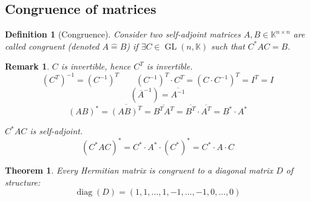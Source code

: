 \documentclass{article}
\newcounter{lecref}[section]
\numberwithin{lecref}{section}
\newtheorem{theorem}[lecref]{Theorem}
\newtheorem{definition}[lecref]{Definition}
\newtheorem{remark}[lecref]{Remark}
\begin{document}
\subsection{Congruence of matrices}

\begin{definition}[Congruence] %
  Consider two self-adjoint matrices $A, B \in \mathbb K^{n \times n}$ are called congruent (denoted $A \hat= B$)
  if $\exists C \in \operatorname{GL}(n, \mathbb K)$ such that $C^* AC = B$.
\end{definition}

\begin{remark}
  $C$ is invertible, hence $C^T$ is invertible.
  \[ (C^T)^{-1} = (C^{-1})^T \qquad (C^{-1})^T \cdot C^T = (C \cdot C^{-1})^T = I^T = I \]
  \[ (\overline{A}^{-1}) = \overline{A^{-1}} \]
  \[ (AB)^* = \overline{(AB)^T} = \overline{B^T A^T} = \overline{B^T} \cdot \overline{A^T} = B^* \cdot A^* \]

  $C^* AC$ is self-adjoint.
  \[ (C^* AC)^* = C^* \cdot A^* \cdot (C^*)^* = C^* \cdot A \cdot C \]
\end{remark}

\begin{theorem} %
  Every Hermitian matrix is congruent to a diagonal matrix $D$ of structure:
  \[ \operatorname{diag}(D) = (1, 1, \dots, 1, -1, \dots, -1, 0, \dots, 0) \]
\end{theorem}
\end{document}
